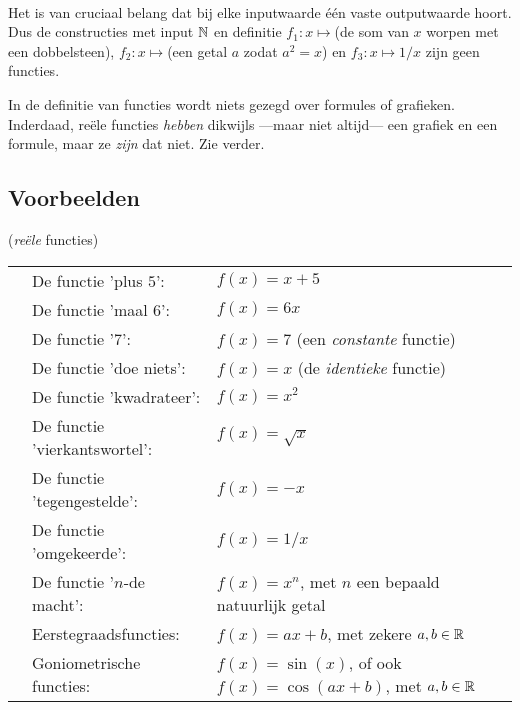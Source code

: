 \documentclass{ximera}
\begin{document}
\begin{remark} \ 
    
 Het is van cruciaal belang dat bij elke inputwaarde één vaste outputwaarde hoort. Dus de constructies met input $\mathbb{N}$ en definitie $f_1: x\mapsto $(de som van $x$ worpen met een dobbelsteen), $f_2: x\mapsto $(een getal $a$ zodat $a^2=x$) en $f_3:x\mapsto 1/x$ zijn geen functies.
 
 
 In de definitie van functies wordt niets gezegd over formules of grafieken. Inderdaad, reële functies \textit{hebben} dikwijls ---maar niet altijd--- een grafiek en een formule, maar ze \textit{zijn} dat niet. Zie verder.
\end{remark}
 
\subsection{Voorbeelden}

\begin{example} (\textit{reële} functies) %
\\
\begin{tabular}[t]{l l l}
    & De functie 'plus $5$':       & $f(x) = x + 5$ \\
    & De functie 'maal 6':         & $f(x) = 6x$ \\
    & De functie '7':              & $f(x) = 7$  (een \textit{constante} functie) \\
    & De functie 'doe niets':      & $f(x) = x$  (de \textit{identieke} functie) \\
    & De functie 'kwadrateer':     & $f(x) = x^2$ \\
    & De functie 'vierkantswortel':& $f(x) = \sqrt{x}$ \\   
    & De functie 'tegengestelde':  & $f(x) = -x$ \\
    & De functie 'omgekeerde':     & $f(x) = 1/x$ \\
    & De functie '$n$-de macht':   & $f(x) = x^n$, met $n$ een bepaald %
     natuurlijk getal \\
    & Eerstegraadsfuncties:        & $f(x) = ax + b$, met zekere $a,b \in \mathbb{R}$  \\
    & Goniometrische functies:     & $f(x) = \sin(x)$, of ook $f(x)=\cos(ax+b)$, met $a,b \in \mathbb{R}$     \\
\end{tabular}

\end{example}
\end{document}
